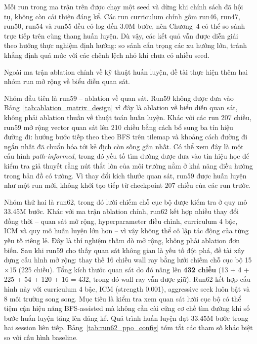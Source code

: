 Mỗi run trong ma trận trên được chạy một seed và dừng khi chính sách đã hội tụ, không còn cải thiện đáng kể. Các run curriculum chính gồm run46, run47, run50, run54 và run55 đều có log đến 3.0M bước, nên Chương~4 có thể so sánh trực tiếp trên cùng thang huấn luyện. Dù vậy, các kết quả vẫn được diễn giải theo hướng thực nghiệm định hướng: so sánh cẩn trọng các xu hướng lớn, tránh khẳng định quá mức với các chênh lệch nhỏ khi chưa có nhiều seed.

Ngoài ma trận ablation chính về kỹ thuật huấn luyện, đề tài thực hiện thêm hai nhóm run mở rộng về biểu diễn quan sát.

Nhóm đầu tiên là run59 -- ablation về quan sát. Run59 không được đưa vào Bảng~\ref{tab:ablation_matrix_design} vì đây là ablation về biểu diễn quan sát, không phải ablation thuần về thuật toán huấn luyện. Khác với các run 207 chiều, run59 mở rộng vector quan sát lên 210 chiều bằng cách bổ sung ba tín hiệu đường đi: hướng bước tiếp theo theo BFS trên tilemap và khoảng cách đường đi ngắn nhất đã chuẩn hóa tới kẻ địch còn sống gần nhất. Có thể xem đây là một cấu hình \emph{path-informed}, trong đó yếu tố tìm đường được đưa vào tín hiệu học để kiểm tra giả thuyết rằng nút thắt lớn của môi trường nằm ở khả năng điều hướng trong bản đồ có tường. Vì thay đổi kích thước quan sát, run59 được huấn luyện như một run mới, không khởi tạo tiếp từ checkpoint 207 chiều của các run trước.

Nhóm thứ hai là run62, trong đó lưới chiếm chỗ cục bộ được kiểm tra ở quy mô 33.45M bước. Khác với ma trận ablation chính, run62 kết hợp nhiều thay đổi đồng thời -- quan sát mở rộng, hyperparameter điều chỉnh, curriculum 4 bậc, ICM và quy mô huấn luyện lớn hơn -- vì vậy không thể cô lập tác động của từng yếu tố riêng lẻ. Đây là thí nghiệm thăm dò mở rộng, không phải ablation đơn biến. Sau khi run59 cho thấy quan sát không gian là yếu tố đột phá, đề tài xây dựng cấu hình mở rộng: thay thế 16 chiều wall ray bằng lưới chiếm chỗ cục bộ 15$\times$15 (225 chiều). Tổng kích thước quan sát do đó nâng lên \textbf{432 chiều} (13 + 4 + 225 + 54 + 120 + 16 = 432, trong đó wall ray vẫn được giữ). Run62 kết hợp cấu hình này với curriculum 4 bậc, ICM (strength 0.001), aggressive seek luôn bật và 8 môi trường song song. Mục tiêu là kiểm tra xem quan sát lưới cục bộ có thể tiệm cận hiệu năng BFS-assisted mà không cần cài cứng cơ chế tìm đường khi số bước huấn luyện tăng lên đáng kể. Quá trình huấn luyện đạt 33.45M bước trong hai session liên tiếp. Bảng~\ref{tab:run62_ppo_config} tóm tắt các tham số khác biệt so với cấu hình baseline.


